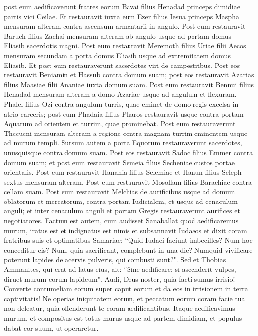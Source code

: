 \begin{biblechapter}
\verse post eum aedificaverunt fratres eorum Bavai filius Henadad princeps dimidiae partis vici Ceilae. 
\verse Et restauravit iuxta eum Ezer filius Iesua princeps Maspha mensuram alteram contra ascensum armentarii in angulo. 
\verse Post eum restauravit Baruch filius Zachai mensuram alteram ab angulo usque ad portam domus Eliasib sacerdotis magni. 
\verse Post eum restauravit Meremoth filius Uriae filii Aecos mensuram secundam a porta domus Eliasib usque ad extremitatem domus Eliasib. 
\verse Et post eum restauraverunt sacerdotes viri de campestribus. 
\verse Post eos restauravit Beniamin et Hassub contra domum suam; post eos restauravit Azarias filius Maasiae filii Ananiae iuxta domum suam.  
\verse Post eum restauravit Bennui filius Henadad mensuram alteram a domo Azariae usque ad angulum et flexuram. 
\verse Phalel filius Ozi contra angulum turris, quae eminet de domo regis excelsa in atrio carceris; post eum Phadaia filius Pharos restauravit 
\verse usque contra portam Aquarum ad orientem et turrim, quae prominebat. 
\verse Post eum restauraverunt Thecueni mensuram alteram a regione contra magnam turrim eminentem usque ad murum templi. 
\verse Sursum autem a porta Equorum restauraverunt sacerdotes, unusquisque contra domum suam. 
\verse Post eos restauravit Sadoc filius Emmer contra domum suam; et post eum restauravit Semeia filius Secheniae custos portae orientalis. 
\verse Post eum restauravit Hanania filius Selemiae et Hanun filius Seleph sextus mensuram alteram. Post eum restauravit Mosollam filius Barachiae contra cellam suam. 
\verse Post eum restauravit Melchias de aurificibus usque ad domum oblatorum et mercatorum, contra portam Iudicialem, et usque ad cenaculum anguli; 
\verse et inter cenaculum anguli et portam Gregis restauraverunt aurifices et negotiatores. 
\verse Factum est autem, cum audisset Sanaballat quod aedificaremus murum, iratus est et indignatus est nimis et subsannavit Iudaeos 
\verse et dixit coram fratribus suis et optimatibus Samariae: “Quid Iudaei faciunt imbecilles? Num hoc conceditur eis? Num, quia sacrificant, complebunt in una die? Numquid vivificare poterunt lapides de acervis pulveris, qui combusti sunt?". 
\verse Sed et Thobias Ammanites, qui erat ad latus eius, ait: “Sine aedificare; si ascenderit vulpes, diruet murum eorum lapideum". 
\verse Audi, Deus noster, quia facti sumus irrisio! Converte contumeliam eorum super caput eorum et da eos in irrisionem in terra captivitatis! 
\verse Ne operias iniquitatem eorum, et peccatum eorum coram facie tua non deleatur, quia offenderunt te coram aedificantibus. 
\verse Itaque aedificavimus murum, et compositus est totus murus usque ad partem dimidiam, et populus dabat cor suum, ut operaretur. 
\end{biblechapter}

